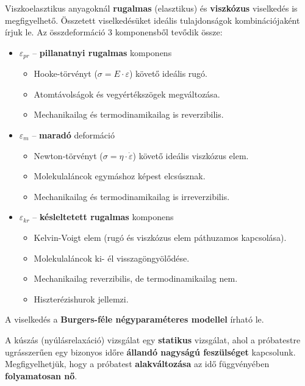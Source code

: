 \documentclass[12pt,a4paper]{article}       %
\begin{document}
\begin{tcbitemize}
  \tcbitem[title={\# \thetcbrasternum{} –
        Mit jelent az, hogy egy polimer viszkoelasztikus?
      }]
  Viszkoelasztikus anyagoknál \textbf{rugalmas} (elasztikus) és
  \textbf{viszkózus} viselkedés is megfigyelhető. Összetett viselkedésüket
  ideális tulajdonságok kombinációjaként írjuk le. Az összdeformáció 3
  komponensből tevődik össze:
  \begin{itemize}
    \item $\varepsilon_{pr}$ – \textbf{pillanatnyi rugalmas} komponens
          \begin{itemize}
            \item Hooke-törvényt ($\sigma = E \cdot \varepsilon$) követő
                  ideális rugó.
            \item Atomtávolságok és vegyértékszögek megváltozása.
            \item Mechanikailag és termodinamikailag is reverzibilis.
          \end{itemize}
    \item $\varepsilon_{m}$ – \textbf{maradó} deformáció
          \begin{itemize}
            \item Newton-törvényt ($\sigma = \eta \cdot \dot{\varepsilon}$)
                  követő ideális viszkózus elem.
            \item Molekulaláncok egymáshoz képest elcsúsznak.
            \item Mechanikailag és termodinamikailag is irreverzibilis.
          \end{itemize}
    \item $\varepsilon_{kr}$ – \textbf{késleltetett rugalmas} komponens
          \begin{itemize}
            \item Kelvin-Voigt elem (rugó és viszkózus elem páthuzamos
                  kapcsolása).
            \item Molekulaláncok ki- él visszagöngyölődése.
            \item Mechanikailag reverzibilis, de termodinamikailag nem.
            \item Hiszterézishurok jellemzi.
          \end{itemize}
  \end{itemize}
  A viselkedés a \textbf{Burgers-féle négyparaméteres modellel} írható le.



  \tcbitem[title={\# \thetcbrasternum{} –
        Mi a kúszás?
      }]
  A kúszás (nyúlásrelaxáció) vizsgálat egy \textbf{statikus} vizsgálat, ahol a
  próbatestre ugrásszerűen egy bizonyos időre \textbf{állandó nagyságú
    feszülséget} kapcsolunk. Megfigyelhetjük, hogy a próbatest
  \textbf{alakváltozása} az idő függvényében \textbf{folyamatosan nő}.




\end{tcbitemize}
\end{document}
